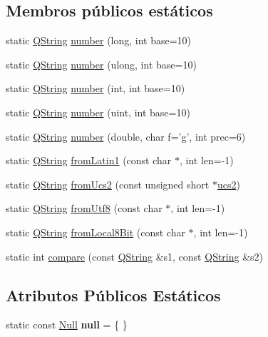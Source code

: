 \subsection*{Membros públicos estáticos}
\begin{DoxyCompactItemize}
\item 
static \hyperlink{class_q_string}{Q\-String} \hyperlink{class_q_string_a9193f869c7d66907180f53ea5b990404}{number} (long, int base=10)
\item 
static \hyperlink{class_q_string}{Q\-String} \hyperlink{class_q_string_ac7dd58912f1c3cb237a958c1cd7a1baa}{number} (ulong, int base=10)
\item 
static \hyperlink{class_q_string}{Q\-String} \hyperlink{class_q_string_a1a8973a97d209f6e029f5cf22400da1a}{number} (int, int base=10)
\item 
static \hyperlink{class_q_string}{Q\-String} \hyperlink{class_q_string_ab48a21ce65b43a870abe7c797faa29b5}{number} (uint, int base=10)
\item 
static \hyperlink{class_q_string}{Q\-String} \hyperlink{class_q_string_a4079d982dfeb3fbcf3b34bf6a418bee8}{number} (double, char f='g', int prec=6)
\item 
static \hyperlink{class_q_string}{Q\-String} \hyperlink{class_q_string_a2f74ebff468010de4e68eeb69a925beb}{from\-Latin1} (const char $\ast$, int len=-\/1)
\item 
static \hyperlink{class_q_string}{Q\-String} \hyperlink{class_q_string_ac97eeecb223fcec01e36985157a1533f}{from\-Ucs2} (const unsigned short $\ast$\hyperlink{class_q_string_aa335352c86d6e44651e98cf3c52356a5}{ucs2})
\item 
static \hyperlink{class_q_string}{Q\-String} \hyperlink{class_q_string_a860d7cc19c5f06337bf3478df15cccd8}{from\-Utf8} (const char $\ast$, int len=-\/1)
\item 
static \hyperlink{class_q_string}{Q\-String} \hyperlink{class_q_string_a267119b3ec4e0fbea508ff30baa0412e}{from\-Local8\-Bit} (const char $\ast$, int len=-\/1)
\item 
static int \hyperlink{class_q_string_a9b931fe2e75b020a33ae06b4928acadb}{compare} (const \hyperlink{class_q_string}{Q\-String} \&s1, const \hyperlink{class_q_string}{Q\-String} \&s2)
\end{DoxyCompactItemize}
\subsection*{Atributos Públicos Estáticos}
\begin{DoxyCompactItemize}
\item 
\hypertarget{class_q_string_a5df51e70f7b42eaa091b9631462537bb}{static const \hyperlink{struct_q_string_1_1_null}{Null} {\bfseries null} = \{ \}}\label{class_q_string_a5df51e70f7b42eaa091b9631462537bb}

\end{DoxyCompactItemize}
